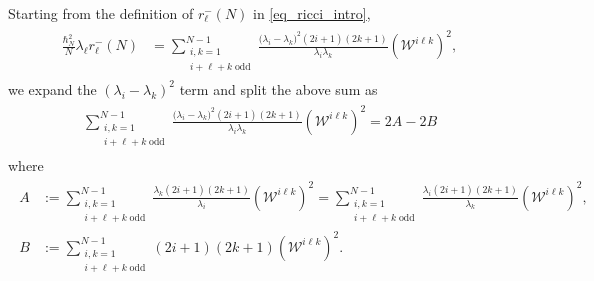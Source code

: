 \documentclass[11pt]{amsart}
\numberwithin{equation}{section}
\theoremstyle{definition}
\begin{document}
Starting from the definition of $r_{\ell}^-(N)$ in \eqref{eq_ricci_intro}, 
\begin{gather}
\begin{split}
\frac{\hbar_N^2}{N} \lambda_\ell r_\ell^{-}(N)
&=
\sum\limits_{\substack{i, k = 1 \\ i+\ell+k\;\mathrm{odd}}}^{N-1}
\frac{
\big(\lambda_i - \lambda_{k}\big)^2
(2i+1)(2k+1)
}
{\lambda_i\lambda_{k}}
(\mathcal{W}^{i\ell k})^2,
\end{split}
\end{gather}
we expand the $(\lambda_i-\lambda_{k})^2$ term and split the above sum as
\begin{gather}
\begin{split}
\sum\limits_{\substack{i, k = 1 \\ i+\ell+k\;\mathrm{odd}}}^{N-1}
\frac{
\big(\lambda_i - \lambda_{k}\big)^2
(2i+1)(2k+1)
}
{\lambda_i\lambda_{k}}(\mathcal{W}^{i\ell k})^2 = 2A - 2B
\end{split}
\end{gather}
where
\begin{gather}\label{eq_ABC}
\begin{split}
A &:= \sum\limits_{\substack{i, k = 1 \\ i+\ell+k\;\mathrm{odd}}}^{N-1}
\frac{
\lambda_{k}(2i+1)(2k+1)
}
{\lambda_i}(\mathcal{W}^{i\ell k})^2 %
= \sum\limits_{\substack{i, k = 1 \\ i+\ell+k\;\mathrm{odd}}}^{N-1}
\frac{
\lambda_i(2i+1)(2k+1)
}
{\lambda_{k}}(\mathcal{W}^{i\ell k})^2, \\ 
B &:=
\sum\limits_{\substack{i, k = 1 \\ i+\ell+k\;\mathrm{odd}}}^{N-1}
(2i+1)(2k+1)(\mathcal{W}^{i\ell k})^2.
\end{split}
\end{gather}
\end{document}
